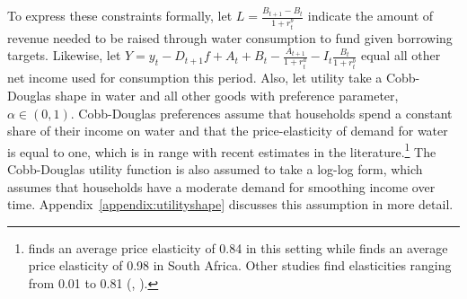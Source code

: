 \documentclass[12pt]{article}
\begin{document}
To express these constraints formally, let $L = \frac{B_{t+1} - B_t }{1+r^{b}_{t}}$ indicate the amount of revenue needed to be raised through water consumption to fund given borrowing targets.  Likewise, let $Y = y_t  - D_{t+1} f   +  A_t + B_t  -  \frac{A_{t+1}}{1+r^{a}_{t}} - I_t \frac{B_t}{1+r^{b}_{t}}$ equal all other net income used for consumption this period.  Also, let utility take a Cobb-Douglas shape in water and all other goods with preference parameter, $\alpha \in (0,1)$.  Cobb-Douglas preferences assume that households spend a constant share of their income on water and that the price-elasticity of demand for water is equal to one, which is in range with recent estimates in the literature.\footnote{\cite{wjv} finds an average price elasticity of 0.84 in this setting while \cite{szabo2015value} finds an average price elasticity of 0.98 in South Africa.  Other studies find elasticities ranging from 0.01 to 0.81 (\cite{diakite2009proposal}, \cite{strand2005water}).}  The Cobb-Douglas utility function is also assumed to take a log-log form, which assumes that households have a moderate demand for smoothing income over time.  Appendix~\ref{appendix:utilityshape} discusses this assumption in more detail.
\end{document}

